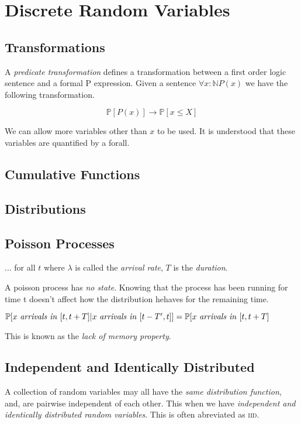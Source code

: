 
\chapter{Discrete Random Variables}




\section{Transformations}


A \textit{predicate transformation}
defines a transformation between a first order logic 
sentence and a formal P expression. 
Given a sentence $\forall x : \mathbb{N} P(x)$ 
we have the following transformation.

$$\mathbb{P}[P(x)] \rightarrow \mathbb{P}[x \leqslant X]$$

We can allow more variables other than $x$ to be used. 
It is understood that these variables are quantified by a forall.


\section{Cumulative Functions}




\section{Distributions}



\section{Poisson Processes}


... for all $t$ where $\lambda$ is called the \textit{arrival rate}, 
$T$ is the \textit{duration}. 


A poisson process has \textit{no state}. 
Knowing that the process has been running for time t doesn’t
affect how the distribution hehaves for the remaining time.

$\mathbb{P}[x \text{ \textit{arrivals in} } [t,t+T] | 
x \text{ \textit{arrivals in} } [t-T',t]]
= \mathbb{P}[x \text{ \textit{arrivals in} } [t,t+T]$

This is known as the \textit{lack of memory property}. 




\section{Independent and Identically Distributed}


A collection of random variables may all have the 
\textit{same distribution function}, and, are pairwise independent 
of each other. This when we have \textit{independent and identically 
distributed random variables}. This is often abreviated as \textsc{iid}.

